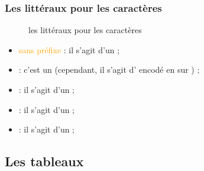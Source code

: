 \documentclass{cppcourses}
\begin{document}
\begin{frame}

\frametitle{Les littéraux pour les caractères}

\begin{figure}
\caption{les littéraux pour les caractères}
\end{figure}


\begin{itemize}
    \item<3-> \textcolor{orange}{sans préfixe} : il s'agit d'un  ;
    \item<4-> \mykeyword{\textcolor{orange}{u8}} : c'est un  (cependant, il s'agit d' encodé en  sur ) ;
    \item<5-> \mykeyword{\textcolor{orange}{u}} : il s'agit d'un  ;
    \item<6-> \mykeyword{\textcolor{orange}{U}} : il s'agit d'un  ;
    \item<7-> \mykeyword{\textcolor{orange}{L}} : il s'agit d'un  ;
\end{itemize}

\end{frame}

\subsection{Les tableaux}
\end{document}
